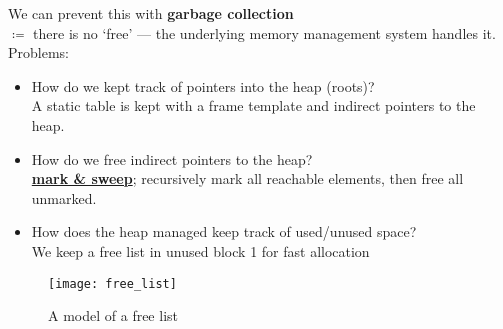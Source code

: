 \documentclass[../../lecture_notes.tex]{subfiles}
\begin{document}
\noindent We can prevent this with \textbf{{garbage collection}}\\
	\indent $\coloneqq$ there is no ‘free’ — the underlying memory management system handles it.\\
	\indent Problems: \begin{itemize} [itemsep=0mm]
			\item How do we kept track of pointers into the heap (roots)?\\
				A static table is kept with a frame template and indirect pointers to the heap.
			\item How do we free indirect pointers to the heap?\\
				\textbf{\underline{mark \& sweep}}; 
					recursively mark all reachable elements, then free all unmarked.
			\item How does the heap managed keep track of used/unused space?\\
				We keep a free list in unused block 1 for fast allocation
		\end{itemize}

\begin{figure}[H]
	\centering
	\texttt{[image: free\_list]}
	\caption{A model of a free list}
	\label{fig:test}
\end{figure}
\end{document}

